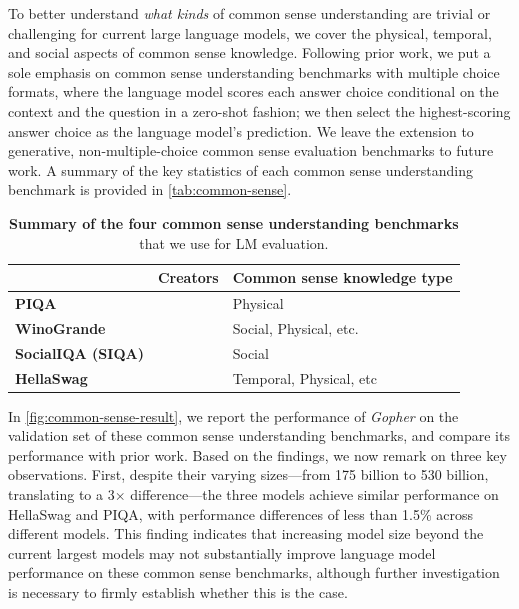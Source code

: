 \documentclass[11pt, a4paper, logo, internal, copyright, nonumbering]{deepmind}
\newcommand{\gopher}{\textit{Gopher}\xspace}
\begin{document}
To better understand {\it what kinds} of common sense understanding are trivial or challenging for current large language models, we cover the physical, temporal, and social aspects of common sense knowledge. Following prior work, we put a sole emphasis on common sense understanding benchmarks with multiple choice formats, where the language model scores each answer choice conditional on the context and the question in a zero-shot fashion; we then select the highest-scoring answer choice as the language model's prediction. We leave the extension to generative, non-multiple-choice common sense evaluation benchmarks to future work. A summary of the key statistics of each common sense understanding benchmark is provided in \autoref{tab:common-sense}.


\begin{table}[h]
\centering
\begin{tabular}{@{}ll|l@{}}
\toprule
   & \textbf{Creators} &  \textbf{Common sense knowledge type} \\ \midrule
\textbf{PIQA} & \citet{piqa}                         & Physical                                       \\
\textbf{WinoGrande} & \citet{winogrande}                         & Social, Physical, etc.                       \\
\textbf{SocialIQA (SIQA)} & \citet{socialiqa}                          & Social                                           \\
\textbf{HellaSwag} & \citet{hellaswag}                           & Temporal, Physical, etc                        \\
 \bottomrule
\end{tabular}

 \caption{\textbf{Summary of the four common sense understanding benchmarks} that we use for LM evaluation.}
 \label{tab:common-sense}
\end{table}

In \autoref{fig:common-sense-result}, we report the performance of \gopher on the validation set of these common sense understanding benchmarks, and compare its performance with prior work. Based on the findings, we now remark on three key observations. 
%
First, despite their varying sizes---from 175 billion to 530 billion, translating to a 3$\times$ difference---the three models achieve similar performance on HellaSwag and PIQA, with performance differences of less than 1.5\% across different models. This finding indicates that increasing model size beyond the current largest models may not substantially improve language model performance on these common sense benchmarks, although further investigation is necessary to firmly establish whether this is the case.
\end{document}
